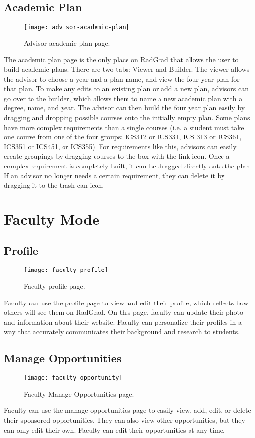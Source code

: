 \subsection{Academic Plan}
\begin{figure}[htbp!]
\centering
\texttt{[image: advisor-academic-plan]}
\caption{Advisor academic plan page.}
\end{figure}
The academic plan page is the only place on RadGrad that allows the user to build academic plans. There are two tabs: Viewer and Builder. The viewer allows the advisor to choose a year and a plan name, and view the four year plan for that plan. To make any edits to an existing plan or add a new plan, advisors can go over to the builder, which allows them to name a new academic plan with a degree, name, and year. The advisor can then build the four year plan easily by dragging and dropping possible courses onto the initially empty plan. Some plans have more complex requirements than a single courses (i.e. a student must take one course from one of the four groups: ICS312 or ICS331, ICS 313 or ICS361, ICS351 or ICS451, or ICS355). For requirements like this, advisors can easily create groupings by dragging courses to the box with the link icon. Once a complex requirement is completely built, it can be dragged directly onto the plan. If an advisor no longer needs a certain requirement, they can delete it by dragging it to the trash can icon. 

\section{Faculty Mode}
\subsection{Profile}
\begin{figure}[htbp!]
\centering
\texttt{[image: faculty-profile]}
\caption{Faculty profile page.}
\end{figure}
Faculty can use the profile page to view and edit their profile, which reflects how others will see them on RadGrad. On this page, faculty can update their photo and information about their website. Faculty can personalize their profiles in a way that accurately communicates their background and research to students. 
\subsection{Manage Opportunities}
\begin{figure}[htbp!]
\centering
\texttt{[image: faculty-opportunity]}
\caption{Faculty Manage Opportunities page.}
\end{figure}
Faculty can use the manage opportunities page to easily view, add, edit, or delete their sponsored opportunities. They can also view other opportunities, but they can only edit their own. Faculty can edit their opportunities at any time.
